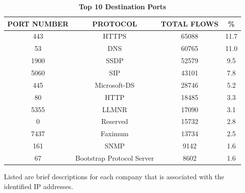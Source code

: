 \documentclass[journal]{IEEE/IEEEtran}
\begin{document}
\begin{table}[ht]
\centering
\caption{\textbf{Top 10 Destination Ports}}
\label{top-dest-ports}
\begin{tabular}{|c|c|c|c|}
\hline
\textbf{PORT NUMBER}			& \textbf{PROTOCOL}			& \textbf{TOTAL FLOWS}		& \textbf{\%} 	 \\ \hline
    443							& HTTPS						&  65088					& 11.7  	     \\ \hline
    53							& DNS						&  60765        			& 11.0			 \\ \hline
    1900						& SSDP						&  52579					& 9.5			 \\ \hline
    5060						& SIP						&  43101          			& 7.8   	     \\ \hline
    445							& Microsoft-DS				&  28746           			& 5.2        	 \\ \hline
    80							& HTTP						&  18485					& 3.3         	 \\ \hline
    5355						& LLMNR						&  17090    		        & 3.1    	     \\ \hline
    0							& Reserved					&  15732		            & 2.8       	 \\ \hline
    7437						& Faximum					&  13734        		    & 2.5         	 \\ \hline
    161							& SNMP						&  9142        			    & 1.6         	 \\ \hline
    67							& Bootstrap Protocol Server	&  8602        			    & 1.6         	 \\ \hline
\end{tabular}
\end{table}

Listed are brief descriptions for each company that is associated with the identified IP addresses.
\end{document}
